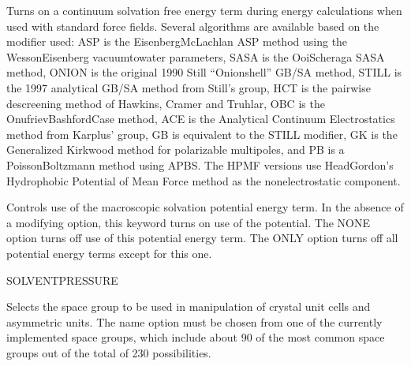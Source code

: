 \documentclass[letterpaper,11pt,english]{sphinxmanual}
\begin{document}
\ignorespaces {}\label{\detokenize{text/keywords:key-solvate}}\begin{description}
\sphinxAtStartPar
Turns on a continuum solvation free energy term during energy calculations when used with standard force fields. Several algorithms are available based on the modifier used: ASP is the Eisenberg\sphinxhyphen{}McLachlan ASP method using the Wesson\sphinxhyphen{}Eisenberg vacuum\sphinxhyphen{}to\sphinxhyphen{}water parameters, SASA is the Ooi\sphinxhyphen{}Scheraga SASA method, ONION is the original 1990 Still “Onion\sphinxhyphen{}shell” GB/SA method, STILL is the 1997 analytical GB/SA method from Still’s group, HCT is the pairwise descreening method of Hawkins, Cramer and Truhlar, OBC is the Onufriev\sphinxhyphen{}Bashford\sphinxhyphen{}Case method, ACE is the Analytical Continuum Electrostatics method from Karplus’ group, GB is equivalent to the STILL modifier, GK is the Generalized Kirkwood method for polarizable multipoles, and PB is a Poisson\sphinxhyphen{}Boltzmann method using APBS. The HPMF versions use Head\sphinxhyphen{}Gordon’s Hydrophobic Potential of Mean Force method as the non\sphinxhyphen{}electrostatic component.

\end{description}

\ignorespaces {}\label{\detokenize{text/keywords:key-solvateterm}}\begin{description}
\sphinxAtStartPar
Controls use of the macroscopic solvation potential energy term. In the absence of a modifying option, this keyword turns on use of the potential. The NONE option turns off use of this potential energy term. The ONLY option turns off all potential energy terms except for this one.

\end{description}

\ignorespaces {}\label{\detokenize{text/keywords:key-solvent-pressure}}
\sphinxAtStartPar
SOLVENT\sphinxhyphen{}PRESSURE

\ignorespaces {}\label{\detokenize{text/keywords:key-spacegroup}}\begin{description}
\sphinxAtStartPar
Selects the space group to be used in manipulation of crystal unit cells and asymmetric units. The name option must be chosen from one of the currently implemented space groups, which include about 90 of the most common space groups out of the total of 230 possibilities.

\end{description}
\end{document}

